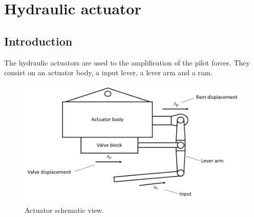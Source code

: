 \section{Hydraulic actuator}

\subsection{Introduction}

  The hydraulic actuators are used to the amplification of the pilot forces. They consist on an actuator body, a input lever, a lever arm and a ram. 

  \begin{figure}[!htpb]
    \centering
    \includegraphics[width=0.7 \textwidth]{figures/diagramActuator}
    \caption[Actuator schematic view]{Actuator schematic view.}
    \label{fig:diagramActuator}
  \end{figure}
